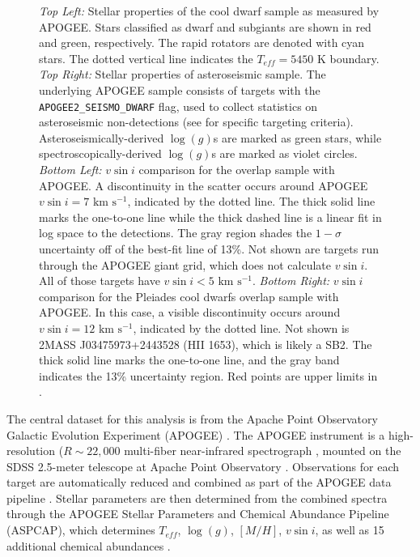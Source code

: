 \documentclass[manuscript]{aastex6}
\newcommand{\vsini}{\ensuremath{v \sin i}}
\newcommand{\Teff}{\ensuremath{T_{eff}}}
\newcommand{\logg}{\ensuremath{\log(g)}}
\newcommand{\kms}{\textrm{ km~s}\ensuremath{^{-1}}}
\newcommand{\APOGEESEISMO}{\texttt{APOGEE2\_SEISMO\_DWARF}}
\begin{document}
\begin{figure}
    \caption{\emph{Top Left:} Stellar properties of the cool dwarf sample as
        measured by APOGEE\@. Stars classified as dwarf and subgiants are shown in 
        red and green, respectively. The rapid rotators are denoted with cyan 
        stars. The dotted vertical line indicates the \(\Teff = 5450\) K
        boundary.
        \emph{Top Right:} Stellar properties of asteroseismic sample. The 
        underlying APOGEE sample consists of targets with the 
        \APOGEESEISMO{} flag, used to collect statistics on 
        asteroseismic non-detections (see \citet{Zasowski17} for specific 
        targeting criteria). Asteroseismically-derived \logg{}s are marked 
        as green stars, while spectroscopically-derived \logg{}s are marked as 
        violet circles.
        \emph{Bottom Left:} \vsini{} comparison for the \citet{Bruntt12} overlap 
        sample with APOGEE\@. A discontinuity in the
        scatter occurs around APOGEE \(\vsini=7 \kms\), indicated by the dotted
        line. The thick solid line 
        marks the one-to-one line while the thick dashed line is a linear fit in 
        log space to the detections. The gray region shades the \(1-\sigma\)
        uncertainty off of the best-fit line of 13\%. Not shown are targets 
        run through the APOGEE giant grid, which does not calculate \vsini. 
        All of those targets have \citet{Bruntt12} \(\vsini < 5 \kms\). 
        \emph{Bottom Right:} 
        \vsini{} comparison for the Pleiades cool dwarfs \citep{Stauffer87} 
        overlap sample with APOGEE\@. In this case, a visible discontinuity 
        occurs around \(\vsini=12\kms\), indicated by the dotted line. Not 
        shown is 2MASS J03475973+2443528 (HII 1653), which 
        is likely a SB2. The thick solid line marks the one-to-one line, and
        the gray band indicates the 13\% uncertainty region.
        Red points are upper limits in \citet{Stauffer87}.\label{fig:sample}}
\end{figure}

The central dataset for this analysis is from the Apache Point Observatory 
Galactic Evolution Experiment (APOGEE) \citep{Blanton17,Majewski17}. The
APOGEE instrument is a high-resolution (\(R \sim 22,000\) multi-fiber 
near-infrared spectrograph \citep{Wilson10}, mounted on the SDSS 2.5-meter 
telescope at Apache Point Observatory \citep{Gunn06}. Observations for each
target are automatically reduced and combined as part of the APOGEE data 
pipeline \citep{Nidever15}. Stellar parameters are then determined from the 
combined spectra through the APOGEE Stellar Parameters and Chemical Abundance 
Pipeline (ASPCAP), which determines \Teff{}, \logg{}, \([M/H]\), \vsini{}, as 
well as 15 additional chemical abundances \citep{GarciaPerez16}.
\end{document}
